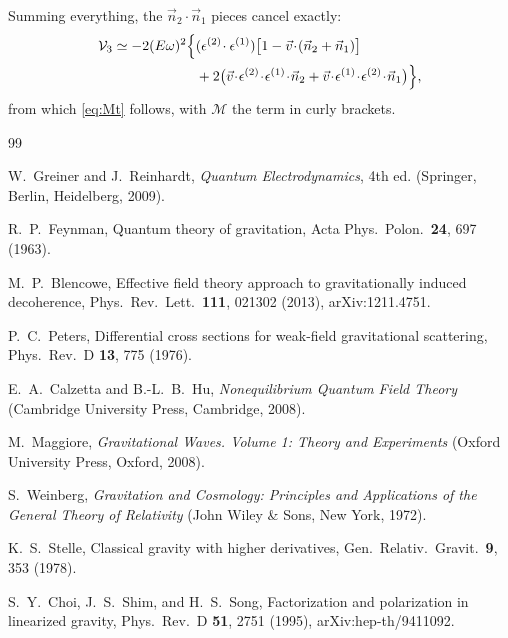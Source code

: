 \documentclass[12pt,a4paper,oneside]{article}
\numberwithin{equation}{section}   %
\begin{document}
\bigskip
\noindent
Summing everything, the $\vec n_2\!\cdot\!\vec n_1$ pieces cancel exactly:
\begin{equation}
\begin{split}
\mathcal{V}_3\simeq-2(E\omega)^2\Bigl\{&(\epsilon^{(2)}\!\cdot\epsilon^{(1)})
\bigl[1-\vec v\!\cdot\!(\vec n_2+\vec n_1)\bigr]\\
&+2\bigl(\vec v\!\cdot\!\epsilon^{(2)}\!\cdot\!\epsilon^{(1)}\!\cdot\!\vec n_2
+\vec v\!\cdot\!\epsilon^{(1)}\!\cdot\!\epsilon^{(2)}\!\cdot\!\vec n_1\bigr)\Bigr\},
\end{split}
\label{eq:V3-limit}
\end{equation}
from which \eqref{eq:Mt} follows, with $\mathcal M$ the term in curly brackets.




\begin{thebibliography}{99}

W.~Greiner and J.~Reinhardt,
\textit{Quantum Electrodynamics}, 4th ed.
(Springer, Berlin, Heidelberg, 2009).

R.~P.~Feynman,
Quantum theory of gravitation,
Acta Phys.\ Polon.\ \textbf{24}, 697 (1963).

M.~P.~Blencowe,
Effective field theory approach to gravitationally induced decoherence,
Phys.\ Rev.\ Lett.\ \textbf{111}, 021302 (2013),
arXiv:1211.4751.

P.~C.~Peters,
Differential cross sections for weak-field gravitational scattering,
Phys.\ Rev.\ D \textbf{13}, 775 (1976).

E.~A.~Calzetta and B.-L.~B.~Hu,
\textit{Nonequilibrium Quantum Field Theory}
(Cambridge University Press, Cambridge, 2008).

M.~Maggiore,
\textit{Gravitational Waves. Volume 1: Theory and Experiments}
(Oxford University Press, Oxford, 2008).

S.~Weinberg,
\textit{Gravitation and Cosmology: Principles and Applications of the
General Theory of Relativity}
(John Wiley \& Sons, New York, 1972).

K.~S.~Stelle,
Classical gravity with higher derivatives,
Gen.\ Relativ.\ Gravit.\ \textbf{9}, 353 (1978).

S.~Y.~Choi, J.~S.~Shim, and H.~S.~Song,
Factorization and polarization in linearized gravity,
Phys.\ Rev.\ D \textbf{51}, 2751 (1995),
arXiv:hep-th/9411092.


\end{thebibliography}
\end{document}
